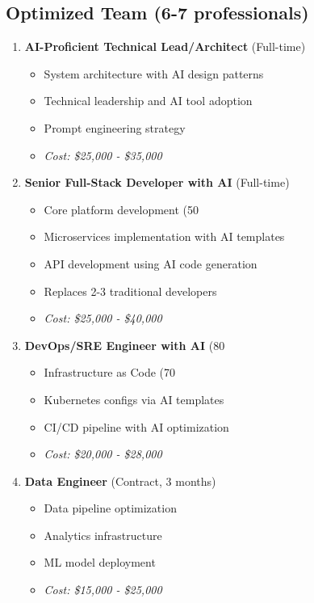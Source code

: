 \documentclass[12pt,a4paper]{report}
\begin{document}
\subsection{Optimized Team (6-7 professionals)}

\begin{enumerate}
    \item \textbf{AI-Proficient Technical Lead/Architect} (Full-time)
    \begin{itemize}
        \item System architecture with AI design patterns
        \item Technical leadership and AI tool adoption
        \item Prompt engineering strategy
        \item \textit{Cost: \$25,000 - \$35,000}
    \end{itemize}
    
    \item \textbf{Senior Full-Stack Developer with AI} (Full-time)
    \begin{itemize}
        \item Core platform development (50%
        \item Microservices implementation with AI templates
        \item API development using AI code generation
        \item Replaces 2-3 traditional developers
        \item \textit{Cost: \$25,000 - \$40,000}
    \end{itemize}
    
    \item \textbf{DevOps/SRE Engineer with AI} (80%
    \begin{itemize}
        \item Infrastructure as Code (70%
        \item Kubernetes configs via AI templates
        \item CI/CD pipeline with AI optimization
        \item \textit{Cost: \$20,000 - \$28,000}
    \end{itemize}
    
    \item \textbf{Data Engineer} (Contract, 3 months)
    \begin{itemize}
        \item Data pipeline optimization
        \item Analytics infrastructure
        \item ML model deployment
        \item \textit{Cost: \$15,000 - \$25,000}
    \end{itemize}
    

\end{enumerate}
\end{document}
